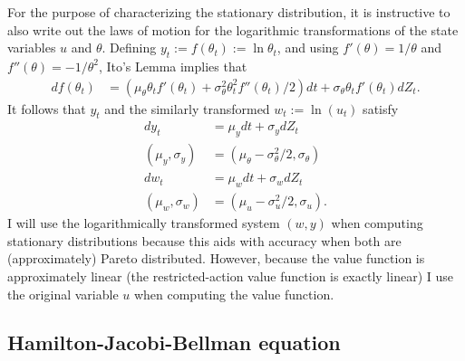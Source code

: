 \documentclass[11pt]{article}
\theoremstyle{plain}
\begin{document}
For the purpose of characterizing the stationary distribution, it is instructive to also write out the laws of motion for the logarithmic transformations of the state variables $u$ and $\theta$. Defining $y_t := f(\theta_t) := \ln \theta_t$, and using $f'(\theta) = 1/\theta$ and $f''(\theta) = -1/\theta^2$, Ito's Lemma implies that 
\begin{align*}
df(\theta_t) & = {\left(\mu_{\theta} \theta_t f'(\theta_t) + \sigma_{\theta}^2 \theta_t^2 f''(\theta_t)/2 \right)}dt + \sigma_{\theta} \theta_t f'(\theta_t) dZ_t.
\end{align*}
It follows that $y_t$ and the similarly transformed $w_t := \ln(u_t)$ satisfy
\begin{equation}
\begin{aligned}
dy_t & = \mu_y dt + \sigma_y dZ_t
\\ (\mu_y, \sigma_y) & = (\mu_{\theta} - \sigma_{\theta}^2/2, \sigma_{\theta})
\\ dw_t & = \mu_w dt + \sigma_w dZ_t
\\ (\mu_w, \sigma_w) & = (\mu_u - \sigma_u^2/2, \sigma_u).
\end{aligned}
\label{yw_trans}
\end{equation}
I will use the logarithmically transformed system $(w, y)$ when computing stationary distributions because this aids with accuracy when both are (approximately) Pareto distributed. However, because the value function is approximately linear (the restricted-action value function is exactly linear) I use the original variable $u$ when computing the value function. 



\subsection{Hamilton-Jacobi-Bellman equation} \label{HJB}
\end{document}
